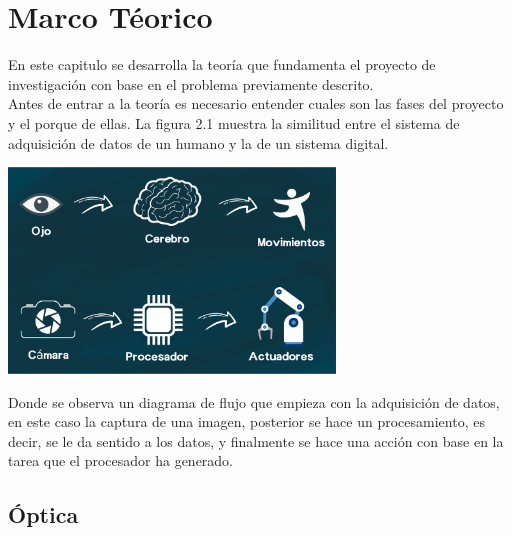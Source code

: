 \chapter{Marco Téorico}


En este capitulo se desarrolla la teoría que fundamenta el proyecto de investigación con base
en el problema previamente descrito.\\
Antes de entrar a la teoría es necesario entender cuales son las fases del proyecto y
el porque de ellas.
La figura 2.1 muestra la similitud entre el sistema de adquisición de datos
de un humano y la de un sistema digital.
\begin{center}
	\includegraphics[width=0.65\textwidth]{Contenido/Cuerpo/Capitulo2/Fig1.eps}
	\label{fig:MarcoTeorico:Fig1}
\end{center}
Donde se observa un diagrama de flujo que empieza con la adquisición de datos, en este
caso la captura de una imagen, posterior se hace un procesamiento, es decir, se le da
sentido a los datos, y finalmente se hace una acción con base en la tarea que el procesador
ha generado.


\section{Óptica}

